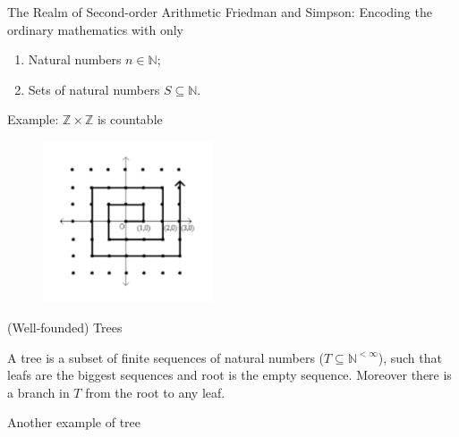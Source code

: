 \documentclass{beamer} %
\begin{document}
\begin{frame}{The Realm of Second-order Arithmetic}
    Friedman and Simpson: Encoding the ordinary mathematics with only 
    \begin{enumerate}
        \item Natural numbers $n \in \mathbb{N}$;
        \item Sets of natural numbers $S \subseteq \mathbb{N}$.
    \end{enumerate}
    \pause
    Example: $\mathbb{Z} \times \mathbb{Z}$ is countable
    \begin{figure}
        \includegraphics[width=5cm]{IMG_0607.jpg}
    \end{figure}
    
\end{frame}

\begin{frame}{(Well-founded) Trees}
    \begin{definition}
        A tree is a subset of finite sequences of natural numbers ($T \subseteq \mathbb{N}^{<\infty}$), such that 
        leafs are the biggest sequences and root is the empty sequence. Moreover there is a branch in $T$ from the root 
        to any leaf.
    \end{definition}
    \pause
    \begin{figure}
    \end{figure}
\end{frame}

\begin{frame}{Another example of tree}
    \begin{figure}
    \end{figure}    
\end{frame}
\end{document}
